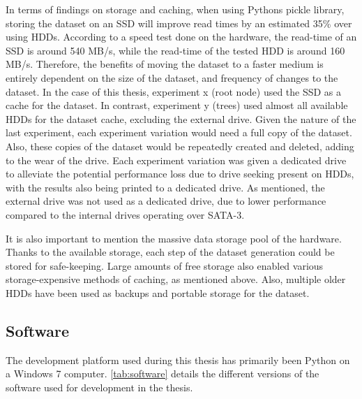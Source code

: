 In terms of findings on storage and caching, when using Pythons pickle library, storing the dataset on an SSD will improve read times by an estimated 35\% over using HDDs.
According to a speed test done on the hardware, the read-time of an SSD is around 540 MB/s, while the read-time of the tested HDD is around 160 MB/s.
Therefore, the benefits of moving the dataset to a faster medium is entirely dependent on the size of the dataset, and frequency of changes to the dataset.
In the case of this thesis, experiment x (root node) used the SSD as a cache for the dataset.%
In contrast, experiment y (trees) used almost all available HDDs for the dataset cache, excluding the external drive.%
Given the nature of the last experiment, each experiment variation would need a full copy of the dataset.
Also, these copies of the dataset would be repeatedly created and deleted, adding to the wear of the drive.
Each experiment variation was given a dedicated drive to alleviate the potential performance loss due to drive seeking present on HDDs, with the results also being printed to a dedicated drive.
As mentioned, the external drive was not used as a dedicated drive, due to lower performance compared to the internal drives operating over SATA-3.

It is also important to mention the massive data storage pool of the hardware.
Thanks to the available storage, each step of the dataset generation could be stored for safe-keeping.
Large amounts of free storage also enabled various storage-expensive methods of caching, as mentioned above.
Also, multiple older HDDs have been used as backups and portable storage for the dataset.

\subsection{Software}
The development platform used during this thesis has primarily been Python on a Windows 7 computer.
\cref{tab:software} details the different versions of the software used for development in the thesis.


